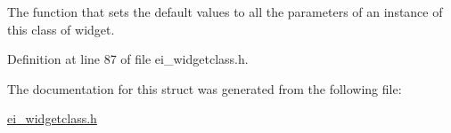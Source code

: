 The function that sets the default values to all the parameters of an instance of this class of widget. 



Definition at line 87 of file ei\+\_\+widgetclass.\+h.



The documentation for this struct was generated from the following file\+:\begin{DoxyCompactItemize}
\item 
\hyperlink{ei__widgetclass_8h}{ei\+\_\+widgetclass.\+h}\end{DoxyCompactItemize}
